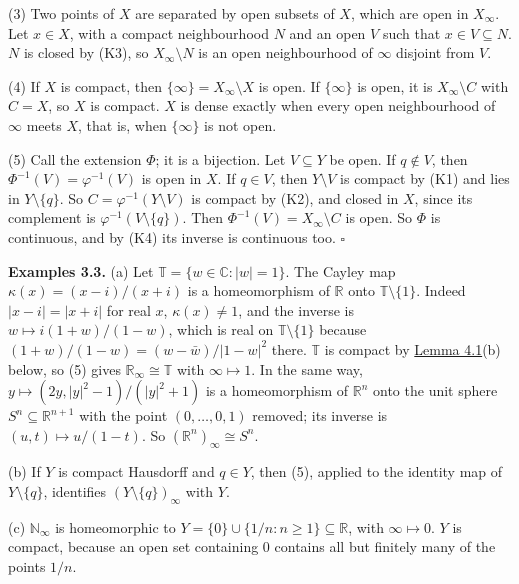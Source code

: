 \documentclass[
  english,
  11pt,
  a4paper,
]{article}
\begin{document}
(3) Two points of \(X\) are separated by open subsets of \(X\), which
are open in \(X_\infty\). Let \(x\in X\), with a compact neighbourhood
\(N\) and an open \(V\) such that \(x\in V\subseteq N\). \(N\) is closed
by (K3), so \(X_\infty\setminus N\) is an open neighbourhood of
\(\infty\) disjoint from \(V\).

(4) If \(X\) is compact, then \(\{\infty\}=X_\infty\setminus X\) is
open. If \(\{\infty\}\) is open, it is \(X_\infty\setminus C\) with
\(C=X\), so \(X\) is compact. \(X\) is dense exactly when every open
neighbourhood of \(\infty\) meets \(X\), that is, when \(\{\infty\}\) is
not open.

(5) Call the extension \(\Phi\); it is a bijection. Let \(V\subseteq Y\)
be open. If \(q\notin V\), then \(\Phi^{-1}(V)=\varphi^{-1}(V)\) is open
in \(X\). If \(q\in V\), then \(Y\setminus V\) is compact by (K1) and
lies in \(Y\setminus\{q\}\). So \(C=\varphi^{-1}(Y\setminus V)\) is
compact by (K2), and closed in \(X\), since its complement is
\(\varphi^{-1}(V\setminus\{q\})\). Then
\(\Phi^{-1}(V)=X_\infty\setminus C\) is open. So \(\Phi\) is continuous,
and by (K4) its inverse is continuous too. \(\square\)

\textbf{Examples 3.3.} (a) Let \(\mathbb T=\{w\in\mathbb C:|w|=1\}\).
The Cayley map \(\kappa(x)=(x-i)/(x+i)\) is a homeomorphism of
\(\mathbb R\) onto \(\mathbb T\setminus\{1\}\). Indeed \(|x-i|=|x+i|\)
for real \(x\), \(\kappa(x)\neq1\), and the inverse is
\(w\mapsto i(1+w)/(1-w)\), which is real on \(\mathbb T\setminus\{1\}\)
because \((1+w)/(1-w)=(w-\bar w)/|1-w|^2\) there. \(\mathbb T\) is
compact by
\hyperlink{the-stone-weierstrass-theorem-for-functions-vanishing-at-infinity--oa-fnd-sw-15}{Lemma
4.1}(b) below, so (5) gives \(\mathbb R_\infty\cong\mathbb T\) with
\(\infty\mapsto1\). In the same way, \(y\mapsto(2y,|y|^2-1)/(|y|^2+1)\)
is a homeomorphism of \(\mathbb R^n\) onto the unit sphere
\(S^n\subseteq\mathbb R^{n+1}\) with the point \((0,\dots,0,1)\)
removed; its inverse is \((u,t)\mapsto u/(1-t)\). So
\((\mathbb R^n)_\infty\cong S^n\).

(b) If \(Y\) is compact Hausdorff and \(q\in Y\), then (5), applied to
the identity map of \(Y\setminus\{q\}\), identifies
\((Y\setminus\{q\})_\infty\) with \(Y\).

(c) \(\mathbb N_\infty\) is homeomorphic to
\(Y=\{0\}\cup\{1/n:n\geq1\}\subseteq\mathbb R\), with
\(\infty\mapsto0\). \(Y\) is compact, because an open set containing
\(0\) contains all but finitely many of the points \(1/n\).
\end{document}
